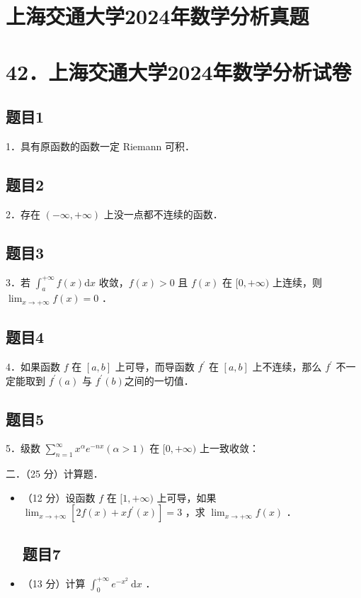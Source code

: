 \documentclass{article}
\begin{document}
\section*{上海交通大学2024年数学分析真题}
\section*{42．上海交通大学2024年数学分析试卷}

\subsection{题目1}
1．具有原函数的函数一定 Riemann 可积．

\subsection{题目2}
2．存在 \((-\infty,+\infty)\) 上没一点都不连续的函数．

\subsection{题目3}
3．若 \(\int_{a}^{+\infty} f(x) \mathrm{d} x\) 收敛，\(f(x)>0\) 且 \(f(x)\) 在 \([0,+\infty)\) 上连续，则 \(\lim _{x \rightarrow+\infty} f(x)=0\) ．

\subsection{题目4}
4．如果函数 \(f\) 在 \([a, b]\) 上可导，而导函数 \(f^{\prime}\) 在 \([a, b]\) 上不连续，那么 \(f^{\prime}\) 不一定能取到 \(f^{\prime}(a)\) 与 \(f^{\prime}(b)\)之间的一切值．

\subsection{题目5}
5．级数 \(\sum_{n=1}^{\infty} x^{\alpha} e^{-n x}(\alpha>1)\) 在 \([0,+\infty)\) 上一致收敛：

二．（25 分）计算题．

\begin{itemize}

\subsection{题目6}
  \item[1．] （12 分）设函数 \(f\) 在 \([1,+\infty)\) 上可导，如果 \(\lim _{x \rightarrow+\infty}\left[2 f(x)+x f^{\prime}(x)\right]=3\) ，求 \(\lim _{x \rightarrow+\infty} f(x)\) ．

\subsection{题目7}
  \item[2．] （13 分）计算 \(\int_{0}^{+\infty} e^{-x^{2}} \mathrm{~d} x\) ．
\end{itemize}
\end{document}

